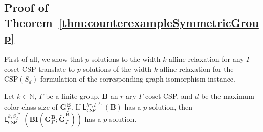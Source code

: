 \documentclass[a4paper,english, thm-restate]{lipics-v2021}
\newcommand{\nat}{\mathbb{N}}
\newcommand{\CFIsym}{\mathbf{G}}
\newcommand{\CFIA}[2]{\CFIsym_{#1}^{#2}}
\newcommand{\CFIB}[2]{\widetilde{\CFIsym}_{#1}^{#2}}
\newcommand{\StructB}{\mathbf{B}}
\newcommand{\CSP}[1]{\mathrm{CSP}(#1)}
\newcommand{\leqs}{\mathsf{L}}
\newcommand{\cspiso}[3]{\leqs^{#1,#2}_{\mathsf{CSP}}(#3)}
\newcommand{\bcisosys}[2]{\mathbf{BI}(#1;#2)}
\newcommand{\CosetGrpTmplt}[2]{#1^{[#2]}}
\newcommand{\Sym}[1]{S_{#1}}
\newcommand{\SymStruct}[2]{\CosetGrpTmplt{\Sym{#1}}{#2}}
\begin{document}
	\subsection{Proof of Theorem~\ref{thm:counterexampleSymmetricGroup}}
	First of all, we show that $p$-solutions to the width-$k$ affine relaxation for any $\Gamma$-coset-CSP translate to $p$-solutions of the width-$k$ affine relaxation for the $\CSP{\Sym{d}}$-formulation of the corresponding graph isomorphism instance.
	
	
	\begin{lemma}
		\label{lem:cfi-p-solution}
		Let $k \in \nat$, $\Gamma$ be a finite group, $\StructB$ an $r$-ary $\Gamma$-coset-CSP,
		and $d$ be the maximum color class size of $\CFIA{\Gamma}{\StructB}$.
		If $\cspiso{kr}{\CosetGrpTmplt{\Gamma}{r}}{\StructB}$ has a $p$-solution,
		then $\cspiso{k}{\SymStruct{d}{2}}{\bcisosys{\CFIA{\Gamma}{\StructB}}{\CFIB{\Gamma}{\StructB}}}$ has a $p$-solution.
	\end{lemma}
\end{document}
